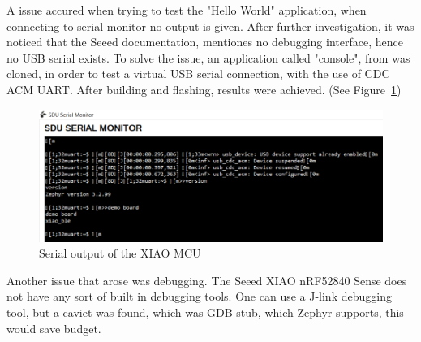 A issue accured when trying to test the "Hello World" application, when connecting to serial monitor no output is given.
After further investigation, it was noticed that the Seeed documentation, mentiones no debugging interface, hence no USB serial exists.
To solve the issue, an application called "console", from  was cloned, in order to test a virtual USB serial connection, with the use of CDC ACM UART. \cite{gitZephyr}
After building and flashing, results were achieved. (See Figure~\ref{fig:serial})

\begin{figure}[H]
    \centering
    \includegraphics[scale = 0.7]{pictures/serial_monitor.png}
    \caption{Serial output of the XIAO MCU}
    \label{fig:serial}
\end{figure}

Another issue that arose was debugging. The Seeed XIAO nRF52840 Sense does not have any sort of built in debugging tools. \cite{wikiSeeed}
One can use a J-link debugging tool, but a caviet was found, which was GDB stub, which Zephyr supports, this would save budget. \cite{docsZephyr}

